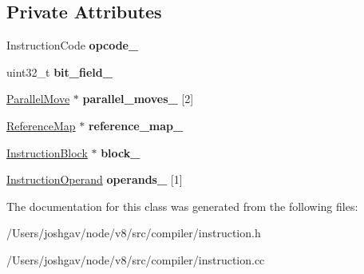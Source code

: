 \subsection*{Private Attributes}
\begin{DoxyCompactItemize}
\item 
Instruction\+Code {\bfseries opcode\+\_\+}\hypertarget{classv8_1_1internal_1_1compiler_1_1_instruction_ae5ebd5b196e673dfc63c7485d1c33d00}{}\label{classv8_1_1internal_1_1compiler_1_1_instruction_ae5ebd5b196e673dfc63c7485d1c33d00}

\item 
uint32\+\_\+t {\bfseries bit\+\_\+field\+\_\+}\hypertarget{classv8_1_1internal_1_1compiler_1_1_instruction_a2c0b9a70223e578728163417bb7526d8}{}\label{classv8_1_1internal_1_1compiler_1_1_instruction_a2c0b9a70223e578728163417bb7526d8}

\item 
\hyperlink{classv8_1_1internal_1_1compiler_1_1_parallel_move}{Parallel\+Move} $\ast$ {\bfseries parallel\+\_\+moves\+\_\+} \mbox{[}2\mbox{]}\hypertarget{classv8_1_1internal_1_1compiler_1_1_instruction_a19eefd75c608541b6a4a5e1a0e442384}{}\label{classv8_1_1internal_1_1compiler_1_1_instruction_a19eefd75c608541b6a4a5e1a0e442384}

\item 
\hyperlink{classv8_1_1internal_1_1compiler_1_1_reference_map}{Reference\+Map} $\ast$ {\bfseries reference\+\_\+map\+\_\+}\hypertarget{classv8_1_1internal_1_1compiler_1_1_instruction_a02dc592ab1f59ed6b88d6226ad32b922}{}\label{classv8_1_1internal_1_1compiler_1_1_instruction_a02dc592ab1f59ed6b88d6226ad32b922}

\item 
\hyperlink{classv8_1_1internal_1_1compiler_1_1_instruction_block}{Instruction\+Block} $\ast$ {\bfseries block\+\_\+}\hypertarget{classv8_1_1internal_1_1compiler_1_1_instruction_ab352e3d03ea0a7279ee371106533b8cb}{}\label{classv8_1_1internal_1_1compiler_1_1_instruction_ab352e3d03ea0a7279ee371106533b8cb}

\item 
\hyperlink{classv8_1_1internal_1_1compiler_1_1_instruction_operand}{Instruction\+Operand} {\bfseries operands\+\_\+} \mbox{[}1\mbox{]}\hypertarget{classv8_1_1internal_1_1compiler_1_1_instruction_a69e6327dfa9e8ecf9435826c65c71dbf}{}\label{classv8_1_1internal_1_1compiler_1_1_instruction_a69e6327dfa9e8ecf9435826c65c71dbf}

\end{DoxyCompactItemize}


The documentation for this class was generated from the following files\+:\begin{DoxyCompactItemize}
\item 
/\+Users/joshgav/node/v8/src/compiler/instruction.\+h\item 
/\+Users/joshgav/node/v8/src/compiler/instruction.\+cc\end{DoxyCompactItemize}
